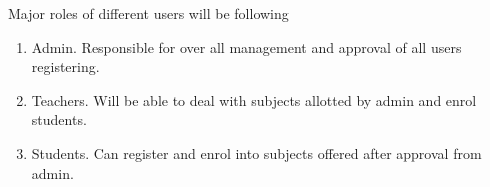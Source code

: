 Major roles of different users will be following
\begin{enumerate}
    \item Admin.  Responsible for over all management and approval of all users registering.
    \item Teachers.  Will be able to deal with subjects allotted by admin and enrol students.
    \item Students.  Can register and enrol into subjects offered after approval from admin.
\end{enumerate}